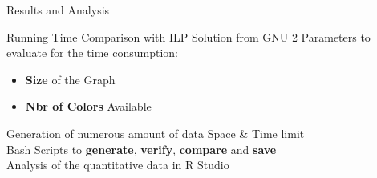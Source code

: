 \documentclass{beamer}
\begin{document}
\begin{frame}{Results and Analysis}

\begin{block}{Running Time Comparison with ILP Solution from GNU}
2 Parameters to evaluate for the time consumption:
\begin{itemize}
\item \textbf{Size} of the Graph
\item \textbf{Nbr of Colors} Available
\end{itemize}
 
\end{block}

Generation of numerous amount of data \textrightarrow{} Space \& Time limit\\
\textrightarrow{}  Bash Scripts to \textbf{generate}, \textbf{verify}, \textbf{compare} and \textbf{save}\\
\textrightarrow{}  Analysis of the quantitative data in R Studio



\end{frame}
\end{document}
